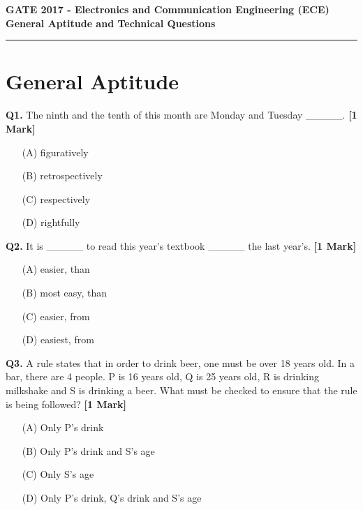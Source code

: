 \documentclass[11pt]{article}
\newcommand{\questiona}[2]{
    \noindent\textbf{Q#2.} #1 \hfill \textbf{[1 Mark]}
}
\begin{document}
\begin{center}
    \Large\textbf{GATE 2017 - Electronics and Communication Engineering (ECE)} \\
    \large\textbf{General Aptitude and Technical Questions} \\
    \rule{\textwidth}{0.5pt} %
\end{center}

\vspace{0.5cm}

\section*{General Aptitude}

\questiona{The ninth and the tenth of this month are Monday and Tuesday \_\_\_\_\_.}{1}
\begin{enumerate}
    \item[(A)] figuratively  
    \item[(B)] retrospectively  
    \item[(C)] respectively  
    \item[(D)] rightfully  
\end{enumerate}

\vspace{0.5cm}

\questiona{It is \_\_\_\_\_ to read this year's textbook \_\_\_\_\_ the last year's.}{2}
\begin{enumerate}
    \item[(A)] easier, than  
    \item[(B)] most easy, than  
    \item[(C)] easier, from  
    \item[(D)] easiest, from  
\end{enumerate}

\vspace{0.5cm}

\questiona{A rule states that in order to drink beer, one must be over 18 years old. In a bar, there are 4 people. P is 16 years old, Q is 25 years old, R is drinking milkshake and S is drinking a beer. What must be checked to ensure that the rule is being followed?}{3}
\begin{enumerate}
    \item[(A)] Only P's drink  
    \item[(B)] Only P's drink and S's age  
    \item[(C)] Only S's age  
    \item[(D)] Only P's drink, Q's drink and S's age  
\end{enumerate}
\end{document}
